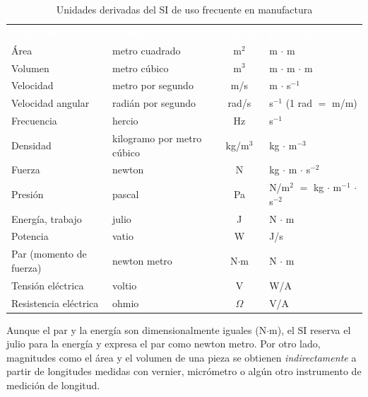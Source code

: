 \documentclass[12pt,a4paper]{article}
\newcommand{\encab}[1]{\textcolor{white}{\sffamily\bfseries #1}}
\begin{document}
\begin{table}[!htb]
	\centering
	\caption{Unidades derivadas del SI de uso frecuente en
		manufactura}\label{tab:derivadas}
	\small
	\begin{tabularx}{\linewidth}{l l c >{\raggedright\arraybackslash}X}
		\rowcolor{darkblue}
		\encab{Magnitud}        & \encab{Unidad}             & \encab{Símbolo} &
		\encab{Expresión}
		\\
		Área                    & metro cuadrado             & m$^2$           & m
		$\cdot$ m
		\\
		Volumen                 & metro cúbico               & m$^3$           & m
		$\cdot$ m $\cdot$ m
		\\
		Velocidad               & metro por segundo          & m/s             & m
		$\cdot$ s$^{-1}$
		\\
		Velocidad angular       & radián por segundo         & rad/s           &
		s$^{-1}$ (1 rad $=$ m/m)
		\\
		Frecuencia              & hercio                     & Hz              &
		s$^{-1}$
		\\
		Densidad                & kilogramo por metro cúbico & kg/m$^3$        & kg
		$\cdot$ m$^{-3}$
		\\
		Fuerza                  & newton                     & N               & kg
		$\cdot$ m $\cdot$ s$^{-2}$
		\\
		Presión                 & pascal                     & Pa              &
		N/m$^2$ $=$ kg $\cdot$ m$^{-1}$ $\cdot$ s$^{-2}$
		\\
		Energía, trabajo        & julio                      & J               & N
		$\cdot$ m
		\\
		Potencia                & vatio                      & W               & J/s
		\\
		Par (momento de fuerza) & newton metro               & N$\cdot$m       & N
		$\cdot$ m
		\\
		Tensión eléctrica       & voltio                     & V               & W/A
		\\
		Resistencia eléctrica   & ohmio                      & $\Omega$        & V/A
		\\
	\end{tabularx}
\end{table}

\vspace{4pt}

Aunque el par y la energía son dimensionalmente iguales (N$\cdot$m), el SI
reserva el julio para la energía y expresa el par como newton metro. Por otro
lado, magnitudes como el área y el volumen de una pieza se obtienen
\emph{indirectamente} a partir de longitudes medidas con vernier, micrómetro o
algún otro instrumento de medición de longitud.
\end{document}
